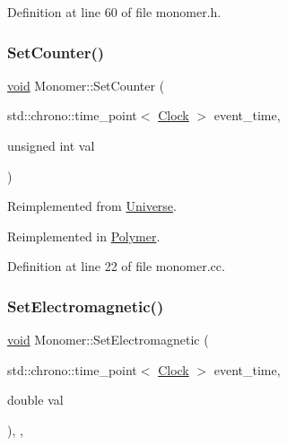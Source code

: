 Definition at line 60 of file monomer.\+h.

\mbox{\label{class_monomer_a6f0dfa4382b3d4fa19b7ee0fb8fe7a55}} 
\subsubsection{\texorpdfstring{Set\+Counter()}{SetCounter()}}
{\footnotesize\ttfamily \mbox{\hyperlink{glad_8h_a950fc91edb4504f62f1c577bf4727c29}{void}} Monomer\+::\+Set\+Counter (\begin{DoxyParamCaption}\item[{std\+::chrono\+::time\+\_\+point$<$ \mbox{\hyperlink{universe_8h_a0ef8d951d1ca5ab3cfaf7ab4c7a6fd80}{Clock}} $>$}]{event\+\_\+time,  }\item[{unsigned int}]{val }\end{DoxyParamCaption})\hspace{0.3cm}{\ttfamily [virtual]}}



Reimplemented from \mbox{\hyperlink{class_universe_aa22202ae740eb1355529afcb13285e91}{Universe}}.



Reimplemented in \mbox{\hyperlink{class_polymer_a1500ffc682396af2f4306c7c7ea7fd87}{Polymer}}.



Definition at line 22 of file monomer.\+cc.

\mbox{\label{class_monomer_a50e41be601b31450a97bfd15950cfb3d}} 
\subsubsection{\texorpdfstring{Set\+Electromagnetic()}{SetElectromagnetic()}}
{\footnotesize\ttfamily \mbox{\hyperlink{glad_8h_a950fc91edb4504f62f1c577bf4727c29}{void}} Monomer\+::\+Set\+Electromagnetic (\begin{DoxyParamCaption}\item[{std\+::chrono\+::time\+\_\+point$<$ \mbox{\hyperlink{universe_8h_a0ef8d951d1ca5ab3cfaf7ab4c7a6fd80}{Clock}} $>$}]{event\+\_\+time,  }\item[{double}]{val }\end{DoxyParamCaption})\hspace{0.3cm}{\ttfamily [inline]}, {\ttfamily [final]}, {\ttfamily [virtual]}}



